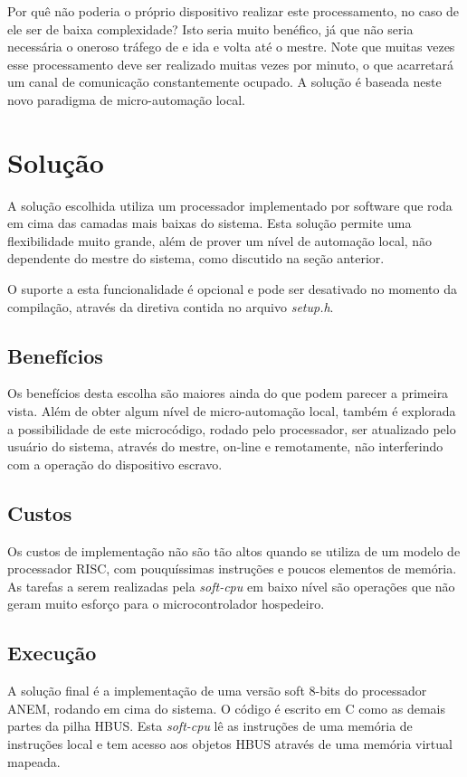 \documentclass[11pt]{report}
\begin{document}
Por quê não poderia o próprio dispositivo realizar este processamento, no caso de ele ser de baixa complexidade? Isto seria muito benéfico, já que não seria necessária o oneroso tráfego de e ida e volta até o mestre. Note que muitas vezes esse processamento deve ser realizado muitas vezes por minuto, o que acarretará um canal de comunicação constantemente ocupado. A solução é baseada neste novo paradigma de micro-automação local.

\section{Solução}

A solução escolhida utiliza um processador implementado por software que roda em cima das camadas mais baixas do sistema. Esta solução permite uma flexibilidade muito grande, além de prover um nível de automação local, não dependente do mestre do sistema, como discutido na seção anterior.

O suporte a esta funcionalidade é opcional e pode ser desativado no momento da compilação, através da diretiva contida no arquivo \textit{setup.h}.

\subsection{Benefícios}
Os benefícios desta escolha são maiores ainda do que podem parecer a primeira vista. Além de obter algum nível de micro-automação local, também é explorada a possibilidade de este microcódigo, rodado pelo processador, ser atualizado pelo usuário do sistema, através do mestre, on-line e remotamente, não interferindo com a operação do dispositivo escravo.

\subsection{Custos}

Os custos de implementação não são tão altos quando se utiliza de um modelo de processador RISC, com pouquíssimas instruções e poucos elementos de memória. As tarefas a serem realizadas pela \textit{soft-cpu} em baixo nível são operações que não geram muito esforço para o microcontrolador hospedeiro.

\subsection{Execução}

A solução final é a implementação de uma versão soft 8-bits do processador ANEM, rodando em cima do sistema. O código é escrito em C como as demais partes da pilha HBUS. Esta \textit{soft-cpu} lê as instruções de uma memória de instruções local e tem acesso aos objetos HBUS através de uma memória virtual mapeada.
\end{document}

